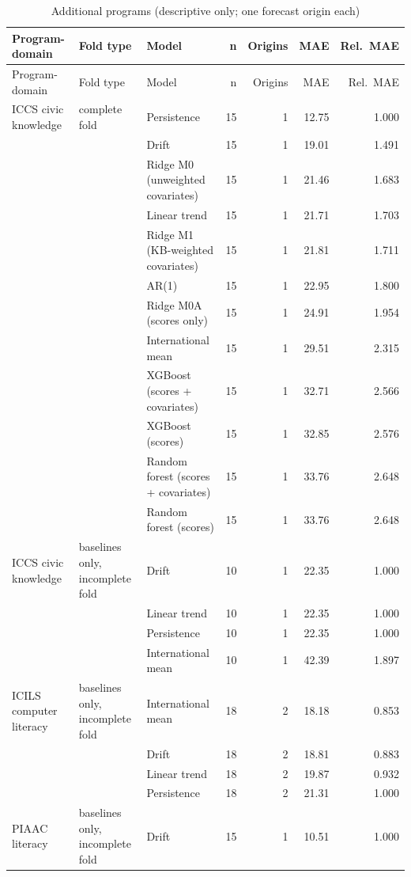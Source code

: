 {\footnotesize
\begin{longtable}{lllrrrr}
\caption{Additional programs (descriptive only; one forecast origin each)}\label{tab:A19}\\
\toprule
Program-domain & Fold type & Model & n & Origins & MAE & Rel.\ MAE \\
\midrule
\endfirsthead
\toprule
Program-domain & Fold type & Model & n & Origins & MAE & Rel.\ MAE \\
\midrule
\endhead
\bottomrule
\endlastfoot
ICCS civic knowledge & complete fold & Persistence & 15 & 1 & 12.75 & 1.000 \\
 &  & Drift & 15 & 1 & 19.01 & 1.491 \\
 &  & Ridge M0 (unweighted covariates) & 15 & 1 & 21.46 & 1.683 \\
 &  & Linear trend & 15 & 1 & 21.71 & 1.703 \\
 &  & Ridge M1 (KB-weighted covariates) & 15 & 1 & 21.81 & 1.711 \\
 &  & AR(1) & 15 & 1 & 22.95 & 1.800 \\
 &  & Ridge M0A (scores only) & 15 & 1 & 24.91 & 1.954 \\
 &  & International mean & 15 & 1 & 29.51 & 2.315 \\
 &  & XGBoost (scores + covariates) & 15 & 1 & 32.71 & 2.566 \\
 &  & XGBoost (scores) & 15 & 1 & 32.85 & 2.576 \\
 &  & Random forest (scores + covariates) & 15 & 1 & 33.76 & 2.648 \\
 &  & Random forest (scores) & 15 & 1 & 33.76 & 2.648 \\
ICCS civic knowledge & baselines only, incomplete fold & Drift & 10 & 1 & 22.35 & 1.000 \\
 &  & Linear trend & 10 & 1 & 22.35 & 1.000 \\
 &  & Persistence & 10 & 1 & 22.35 & 1.000 \\
 &  & International mean & 10 & 1 & 42.39 & 1.897 \\
ICILS computer literacy & baselines only, incomplete fold & International mean & 18 & 2 & 18.18 & 0.853 \\
 &  & Drift & 18 & 2 & 18.81 & 0.883 \\
 &  & Linear trend & 18 & 2 & 19.87 & 0.932 \\
 &  & Persistence & 18 & 2 & 21.31 & 1.000 \\
PIAAC literacy & baselines only, incomplete fold & Drift & 15 & 1 & 10.51 & 1.000 \\

\end{longtable}}
